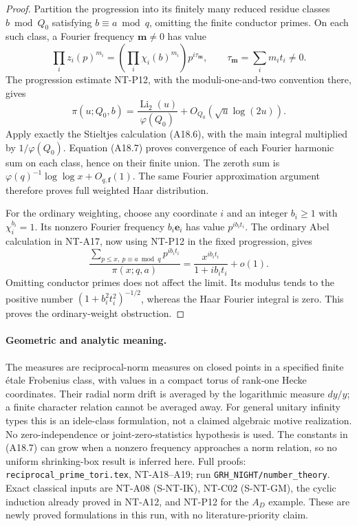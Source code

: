 \begin{proof}
Partition the progression into its finitely many
reduced residue classes \(b\bmod Q_0\) satisfying
\(b\equiv a\bmod q\), omitting the finite conductor
primes. On each such class, a Fourier frequency
\(\mathbf m\ne0\) has value
\[
       \prod_i z_i(p)^{m_i}
        =\left(\prod_i\chi_i(b)^{m_i}\right)p^{i\tau_{\mathbf m}},
       \qquad \tau_{\mathbf m}=\sum_i m_i t_i\ne0.
 \]
The progression estimate NT-P12, with the
moduli-one-and-two convention there, gives
\[
 \pi(u;Q_0,b)
   =\frac{\operatorname{Li}_2(u)}{\varphi(Q_0)}
                              +O_{Q_0}(\sqrt u\log(2u)).
 \]
Apply exactly the Stieltjes calculation (A18.6),
with the main integral multiplied by
\(1/\varphi(Q_0)\). Equation (A18.7) proves
convergence of each Fourier harmonic sum on
each class, hence on their finite union.
The zeroth sum is
\(\varphi(q)^{-1}\log\log x+O_{q,\boldsymbol f}(1)\).
The same Fourier approximation argument therefore
proves full weighted Haar distribution.

For the ordinary weighting, choose any coordinate
\(i\) and an integer \(b_i\ge1\) with
\(\chi_i^{b_i}=1\). Its nonzero Fourier frequency
\(b_i\mathbf e_i\) has value \(p^{ib_i t_i}\).
The ordinary Abel calculation in NT-A17, now
using NT-P12 in the fixed progression, gives
\[
 \frac{\sum_{p\le x,\ p\equiv a\bmod q}p^{ib_i t_i}}
               {\pi(x;q,a)}
       =\frac{x^{ib_i t_i}}{1+ib_i t_i}+o(1).
 \]
Omitting conductor primes does not affect the
limit. Its modulus tends to the positive number
\((1+b_i^2t_i^2)^{-1/2}\), whereas the Haar
Fourier integral is zero. This proves the
ordinary-weight obstruction.
\end{proof}

\paragraph{Geometric and analytic meaning.}
The measures are reciprocal-norm measures on
closed points in a specified finite \'{e}tale
Frobenius class, with values in a compact torus
of rank-one Hecke coordinates. Their radial
norm drift is averaged by the logarithmic
measure \(dy/y\); a finite character relation
cannot be averaged away.
For general unitary infinity types this is an
idele-class formulation, not a claimed algebraic
motive realization. No zero-independence or
joint-zero-statistics hypothesis is used.
The constants in (A18.7) can grow when a nonzero
frequency approaches a norm relation, so no
uniform shrinking-box result is inferred here.
Full proofs: \texttt{reciprocal\_prime\_tori.tex},
NT-A18--A19; run \texttt{GRH\_NIGHT/number\_theory}.
Exact classical inputs are NT-A08 (S-NT-IK),
NT-C02 (S-NT-GM), the cyclic induction already
proved in NT-A12, and NT-P12 for the \(A_D\)
example. These are newly proved formulations
in this run, with no literature-priority claim.
